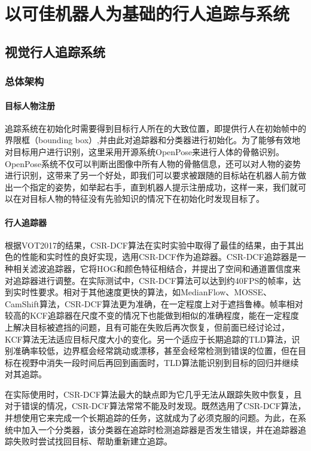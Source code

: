 
\chapter{以可佳机器人为基础的行人追踪与系统}

\section{视觉行人追踪系统}

\subsection{总体架构}

\subsubsection{目标人物注册}

  追踪系统在初始化时需要得到目标行人所在的大致位置，即提供行人在初始帧中的界限框（bounding box）,并由此对追踪器和分类器进行初始化。为了能够有效地对目标用户进行识别，这里采用开源系统OpenPose\cite{cao2018openpose}来进行人体的骨骼识别。OpenPose系统不仅可以判断出图像中所有人物的骨骼信息，还可以对人物的姿势进行识别，这带来了另一个好处，即我们可以要求被跟随的目标站在机器人前方做出一个指定的姿势，如举起右手，直到机器人提示注册成功，这样一来，我们就可以在对目标人物的特征没有先验知识的情况下在初始化时发现目标了。

\subsubsection{行人追踪器}
  根据VOT2017的结果\cite{kristan2017visual}，CSR-DCF算法在实时实验中取得了最佳的结果，由于其出色的性能和实时性的良好实现，选用CSR-DCF作为追踪器。CSR-DCF追踪器是一种相关滤波追踪器，它将HOG和颜色特征相结合，并提出了空间和通道置信度来对追踪器进行调整。在实际测试中，CSR-DCF算法可以达到约40FPS的帧率，达到实时性要求。相对于其他速度更快的算法，如MedianFlow、MOSSE、CamShift算法，CSR-DCF算法更为准确，在一定程度上对于遮挡鲁棒。帧率相对较高的KCF追踪器在尺度不变的情况下也能做到相似的准确程度，能在一定程度上解决目标被遮挡的问题，且有可能在失败后再次恢复，但前面已经讨论过，KCF算法无法适应目标尺度大小的变化。另一个适应于长期追踪的TLD算法，识别准确率较低，边界框会经常跳动或漂移，甚至会经常检测到错误的位置，但在目标在视野中消失一段时间后再回到画面时，TLD算法能识别到目标的回归并继续对其追踪。

  在实际使用时，CSR-DCF算法最大的缺点即为它几乎无法从跟踪失败中恢复，且对于错误的情况，CSR-DCF算法常常不能及时发现。既然选用了CSR-DCF算法，并想使用它来完成一个长期追踪的任务，这就成为了必须克服的问题。为此，在系统中加入一个分类器，该分类器在追踪时检测追踪器是否发生错误，并在追踪器追踪失败时尝试找回目标、帮助重新建立追踪。

